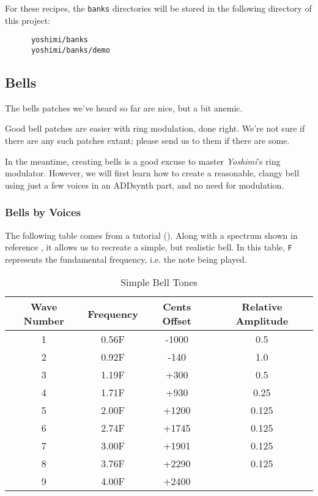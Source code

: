    For these recipes, the \texttt{banks} directories will
   be stored in the following directory of this project:

   \begin{verbatim}
      yoshimi/banks
      yoshimi/banks/demo
   \end{verbatim}

\subsection{Bells}
\label{subsec:cookbook_instruments_bells}

   The bells patches we've heard so far are nice, but a bit anemic.
   
   Good bell patches are easier with ring modulation, done right.  We're not
   sure if there are any such patches extant; please send us to them if
   there are some.

   In the meantime, creating bells is a good excuse to master
   \textsl{Yoshimi}'s ring modulator.
   However, we will first learn how to create a reasonable, clangy bell
   using just a few voices in an ADDsynth part, and no need for modulation.

\subsubsection{Bells by Voices}
\label{subsec:cookbook_instruments_bells_by_voices}

   The following table comes from a tutorial (\cite{bellsimple}).  Along
   with a spectrum shown in reference \cite{bellspectrum}, it allows us to
   recreate a simple, but realistic bell.
   In this table, \texttt{F} represents the fundamental frequency, i.e. the
   note being played.

\label{table:simple_bell_tones}
\begin{longtable}{c c c c}
   \caption{Simple Bell Tones} \\
   \hline
      \textbf{Wave Number} &
      \textbf{Frequency} &
      \textbf{Cents Offset} &
      \textbf{Relative Amplitude} \\
   \hline
   \endfirsthead

   1 &  0.56F &  -1000 &   0.5   \\
   2 &  0.92F &  -140  &   1.0   \\
   3 &  1.19F &  +300  &   0.5   \\
   4 &  1.71F &  +930  &   0.25  \\
   5 &  2.00F &  +1200 &   0.125 \\
   6 &  2.74F &  +1745 &   0.125 \\
   7 &  3.00F &  +1901 &   0.125 \\
   8 &  3.76F &  +2290 &   0.125 \\
   9 &  4.00F &  +2400 &         \\
\end{longtable}

